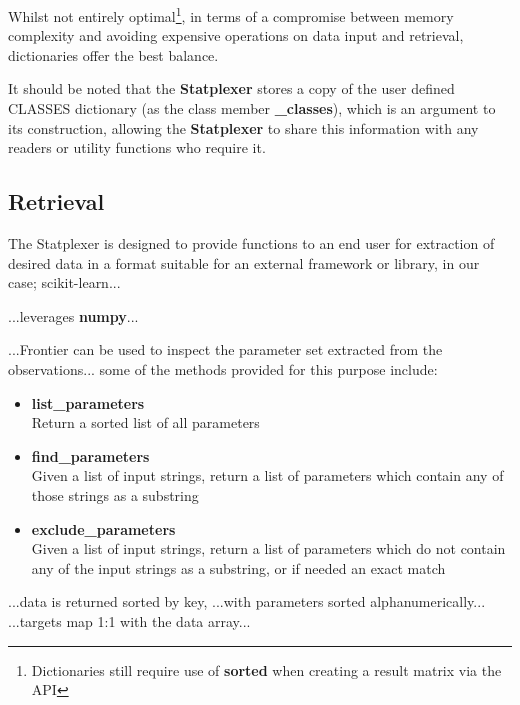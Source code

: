 Whilst not entirely optimal\footnote{Dictionaries still require use of
\textbf{sorted} when creating a result matrix via the API}, in terms of a
compromise between memory complexity and avoiding expensive operations on data
input and retrieval, dictionaries offer the best balance.

It should be noted that the \textbf{Statplexer} stores a copy of the user
defined CLASSES dictionary (as the class member \textbf{\_classes}), which is an
argument to its construction, allowing the \textbf{Statplexer} to share this
information with any readers or utility functions who require it.


\subsection{Retrieval}

The Statplexer is designed to provide functions to an end user for extraction
of desired data in a format suitable for an external framework or library,
in our case; scikit-learn...




...leverages \textbf{numpy}...

...Frontier can be used to inspect the parameter set extracted from the
observations... some of the methods provided for this purpose include:

\begin{itemize}
    \item \textbf{list\_parameters} \hfill\\
        Return a sorted list of all parameters
    \item \textbf{find\_parameters} \hfill\\
        Given a list of input strings, return a list of parameters which contain
        any of those strings as a substring
    \item \textbf{exclude\_parameters} \hfill\\
        Given a list of input strings, return a list of parameters which do not
        contain any of the input strings as a substring, or if needed an exact
        match
\end{itemize}

...data is returned sorted by key,
...with parameters sorted alphanumerically...
...targets map 1:1 with the data array...

